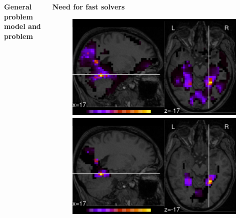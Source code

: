 \documentclass[french]{STIC_poster}
\begin{document}
\begin{frame}[t]
\begin{columns}[t]
\begin{column}{.48\linewidth}
\begin{sxbox}[\textwidth]{\textbf{General problem model and problem}}
				\end{sxbox}
			\end{column}
			\hfill
			\begin{column}{.48\linewidth}
				\begin{nbox}[\textwidth]{\textbf{Need for fast solvers}}
                                  \begin{figure}
                                    \includegraphics[width=.32\linewidth]{maps/face_vs_house_tol_0_1.pdf}%
                                    \hfill%
                                    \includegraphics[width=.32\linewidth]{maps/face_vs_house_tol_0_001.pdf}%
\end{figure}
\end{nbox}
\end{column}
\end{columns}
\end{frame}
\end{document}
